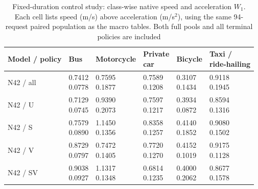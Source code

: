 \begin{table}[htbp]
\centering
\caption{Fixed-duration control study: class-wise native speed and acceleration $W_1$. Each cell lists speed (m/s) above acceleration (m/s$^2$), using the same 94-request paired population as the macro tables. Both full pools and all terminal policies are included}
\label{tab:g34-class-native}
\small
\setlength{\tabcolsep}{3pt}
\renewcommand{\arraystretch}{1.2}
\begin{tabularx}{\linewidth}{@{}l*{5}{>{\centering\arraybackslash}X}@{}}
\toprule
Model / policy & Bus & Motorcycle & \shortstack{Private\\car} & Bicycle & \shortstack{Taxi /\\ride-hailing}\\
\midrule
N42 / all & \shortstack{0.7412\\0.0778} & \shortstack{0.7595\\0.1877} & \shortstack{0.7589\\0.1208} & \shortstack{0.3107\\0.1434} & \shortstack{0.9118\\0.1945}\\
N42 / U & \shortstack{0.7129\\0.0745} & \shortstack{0.9390\\0.2073} & \shortstack{0.7597\\0.1217} & \shortstack{0.3934\\0.0872} & \shortstack{0.8594\\0.1316}\\
N42 / S & \shortstack{0.7579\\0.0890} & \shortstack{1.1450\\0.1356} & \shortstack{0.8358\\0.1257} & \shortstack{0.4140\\0.1852} & \shortstack{0.9080\\0.1502}\\
N42 / V & \shortstack{0.8729\\0.0797} & \shortstack{0.7472\\0.1405} & \shortstack{0.7720\\0.1270} & \shortstack{0.4152\\0.1019} & \shortstack{0.9175\\0.1128}\\
N42 / SV & \shortstack{0.9038\\0.0927} & \shortstack{1.1317\\0.1348} & \shortstack{0.6814\\0.1235} & \shortstack{0.4000\\0.2062} & \shortstack{0.8677\\0.1578}\\

\end{tabularx}
\end{table}
